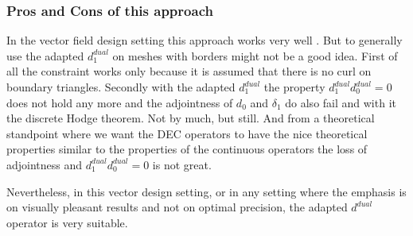 
\subsubsection{ Pros and Cons of this approach}In the vector field design setting this approach works very well . But to generally use the adapted $d^{dual}_1$ on meshes with borders might not be a good idea. First of all the constraint works only because it is assumed that there is no curl on boundary triangles. Secondly  with the adapted $d^{dual}_1$ the property $d^{dual}_1d^{dual}_0 = 0$ does not hold any more and the adjointness of $d_0$ and $\delta_1$ do also fail and with it the discrete Hodge theorem. Not by much, but still. 
And from a theoretical standpoint where we want the DEC operators to have the nice theoretical properties similar to the properties of the continuous operators the loss of adjointness and $d^{dual}_1d^{dual}_0 = 0$ is not great.

Nevertheless, in this vector design setting, or in any setting where the emphasis is on visually pleasant results and not on optimal precision, the adapted $d^{dual}$ operator is very suitable.